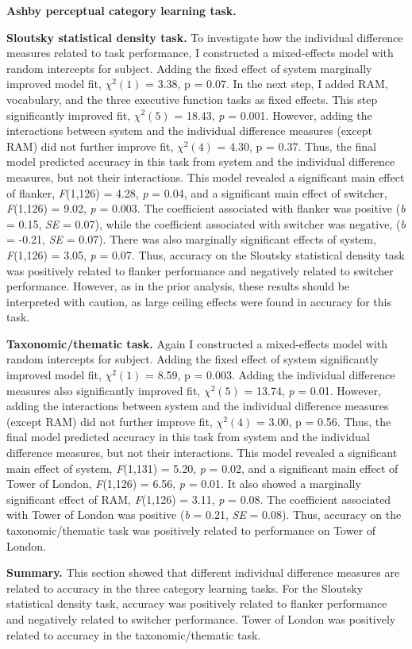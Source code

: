 \documentclass[../dissertation.tex]{subfiles}
\begin{document}
\textbf{Ashby perceptual category learning task.} \par 
\textbf{Sloutsky statistical density task.}  To investigate how the individual difference measures related to task performance, I constructed a mixed-effects model with random intercepts for subject. Adding the fixed effect of system marginally improved model fit,  $\chi^{2}(1)$ = 3.38, p = 0.07. In the next step, I added RAM, vocabulary, and the three executive function tasks as fixed effects. This step significantly improved fit, $\chi^{2}(5)$  = 18.43, \textit{p} = 0.001. However, adding the interactions between system and the individual difference measures (except RAM) did not further improve fit,  $\chi^{2}(4)$ = 4.30, p = 0.37. Thus, the final model predicted accuracy in this task from system and the individual difference measures, but not their interactions. This model revealed a significant main effect of flanker, \textit{F}(1,126) = 4.28, \textit{p} = 0.04, and a significant main effect of switcher, \textit{F}(1,126) = 9.02, \textit{p} = 0.003. The coefficient associated with flanker was positive (\textit{b} = 0.15, \textit{SE} = 0.07), while the coefficient associated with switcher was negative, (\textit{b} = -0.21, \textit{SE} = 0.07). There was also marginally significant effects of system, \textit{F}(1,126) = 3.05, \textit{p} = 0.07. Thus, accuracy on the Sloutsky statistical density task was positively related to flanker performance and negatively related to switcher performance. However, as in the prior analysis, these results should be interpreted with caution, as large ceiling effects were found in accuracy for this task. \par
\textbf{Taxonomic/thematic task.}  Again I constructed a mixed-effects model with random intercepts for subject. Adding the fixed effect of system significantly improved model fit,  $\chi^{2}(1)$ = 8.59, p = 0.003. Adding the individual difference measures also significantly improved fit, $\chi^{2}(5)$  = 13.74, \textit{p} = 0.01. However, adding the interactions between system and the individual difference measures (except RAM) did not further improve fit,  $\chi^{2}(4)$ = 3.00, p = 0.56. Thus, the final model predicted accuracy in this task from system and the individual difference measures, but not their interactions. This model revealed a significant main effect of system, \textit{F}(1,131) = 5.20, \textit{p} = 0.02, and a significant main effect of Tower of London, \textit{F}(1,126) = 6.56, \textit{p} = 0.01. It also showed a marginally significant effect of RAM, \textit{F}(1,126) = 3.11, \textit{p} = 0.08. The coefficient associated with Tower of London was positive (\textit{b} = 0.21, \textit{SE} = 0.08). Thus, accuracy on the taxonomic/thematic task was positively related to performance on Tower of London. \par
\textbf{Summary.} This section showed that different individual difference measures are related to accuracy in the three category learning tasks. For the Sloutsky statistical density task, accuracy was positively related to flanker performance and negatively related to switcher performance. Tower of London was positively related to accuracy in the taxonomic/thematic task.
\end{document}
